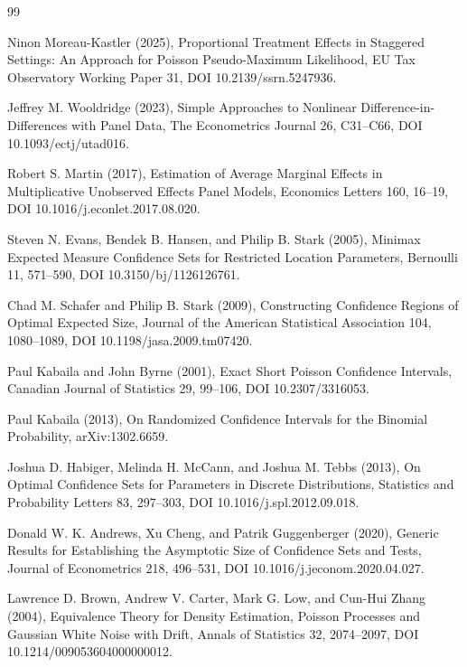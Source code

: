 \documentclass{article}
\begin{document}
\begin{thebibliography}{99}

   Ninon Moreau-Kastler (2025), Proportional Treatment Effects in Staggered Settings: An Approach for Poisson Pseudo-Maximum Likelihood, EU Tax Observatory Working Paper 31, DOI 10.2139/ssrn.5247936.

   Jeffrey M. Wooldridge (2023), Simple Approaches to Nonlinear Difference-in-Differences with Panel Data, The Econometrics Journal 26, C31--C66, DOI 10.1093/ectj/utad016.

   Robert S. Martin (2017), Estimation of Average Marginal Effects in Multiplicative Unobserved Effects Panel Models, Economics Letters 160, 16--19, DOI 10.1016/j.econlet.2017.08.020.

   Steven N. Evans, Bendek B. Hansen, and Philip B. Stark (2005), Minimax Expected Measure Confidence Sets for Restricted Location Parameters, Bernoulli 11, 571--590, DOI 10.3150/bj/1126126761.

   Chad M. Schafer and Philip B. Stark (2009), Constructing Confidence Regions of Optimal Expected Size, Journal of the American Statistical Association 104, 1080--1089, DOI 10.1198/jasa.2009.tm07420.

   Paul Kabaila and John Byrne (2001), Exact Short Poisson Confidence Intervals, Canadian Journal of Statistics 29, 99--106, DOI 10.2307/3316053.

   Paul Kabaila (2013), On Randomized Confidence Intervals for the Binomial Probability, arXiv:1302.6659.

   Joshua D. Habiger, Melinda H. McCann, and Joshua M. Tebbs (2013), On Optimal Confidence Sets for Parameters in Discrete Distributions, Statistics and Probability Letters 83, 297--303, DOI 10.1016/j.spl.2012.09.018.

   Donald W. K. Andrews, Xu Cheng, and Patrik Guggenberger (2020), Generic Results for Establishing the Asymptotic Size of Confidence Sets and Tests, Journal of Econometrics 218, 496--531, DOI 10.1016/j.jeconom.2020.04.027.

   Lawrence D. Brown, Andrew V. Carter, Mark G. Low, and Cun-Hui Zhang (2004), Equivalence Theory for Density Estimation, Poisson Processes and Gaussian White Noise with Drift, Annals of Statistics 32, 2074--2097, DOI 10.1214/009053604000000012.


\end{thebibliography}
\end{document}
